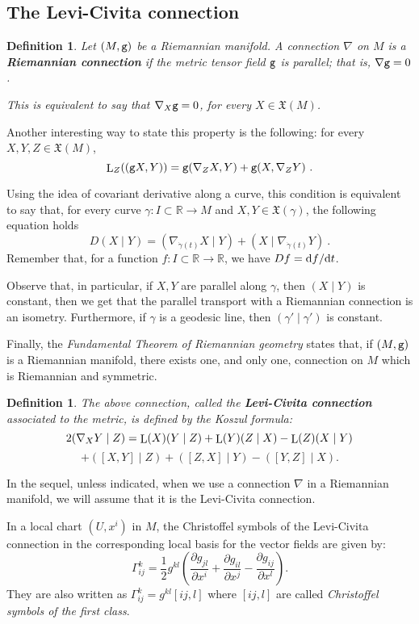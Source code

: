 \documentclass[12pt]{report}
\newtheorem{definition}[teor]{Definition}
\def\vf{\mathfrak X}
\def\d{{\rm d}}
\def\Real{\mathbb{R}}
\def\Lie{\mathop{\rm L}\nolimits}
\begin{document}
\subsection{The Levi-Civita connection}


\begin{definition}
Let $(M,{\tt g})$ be a Riemannian manifold.
A connection $\nabla$ on $M$ is a \textbf{Riemannian connection} 
if the metric tensor field ${\tt g}$ is parallel; that is, $\nabla{\tt g}=0$. 

This is equivalent to say that $\nabla_X{\tt g}=0$, for every $X\in\vf(M)$.
\end{definition}

Another interesting way to state this property is the following:
 for every $X,Y,Z\in\vf(M)$,
$$
\Lie_Z(({\tt g}X,Y))={\tt g}(\nabla_ZX,Y)+{\tt g}(X,\nabla_ZY) \ .
$$  

Using the idea of covariant derivative along a curve,
this condition is equivalent to say that, 
for every curve $\gamma\colon I\subset\Real\to M$ and 
$X,Y\in\vf(\gamma)$,
the following equation holds
  $$
  D(X\mid Y)=(\nabla_{\dot{\gamma}(t)}X\mid Y)+(X\mid\nabla_{\dot\gamma(t)}Y)  \ .
$$
Remember that, for a function $f:I\subset\Real\to\Real$, we have $Df=\d f/\d t$. 

Observe that, in particular, if $X,Y$ are parallel along 
$\gamma$, then $(X\mid Y)$ is constant, 
then we get that the parallel transport with a Riemannian connection is an isometry. 
Furthermore, if $\gamma$ is a geodesic line, then $(\gamma'\mid\gamma')$ is constant.

Finally, the {\sl Fundamental Theorem of Riemannian geometry} states that, 
if $(M,{\tt g})$ is a Riemannian manifold, 
there exists one, and only one, connection on $M$ which is Riemannian and symmetric.

\begin{definition}
The above connection, called the \textbf{Levi-Civita connection}
associated to the metric,  is defined by the {\rm Koszul formula\/}:
$$
2(\nabla_XY\mid Z)=\Lie(X)(Y\mid Z)+\Lie(Y)(Z\mid X)-\Lie(Z)(X\mid Y)
$$
$$
+([X,Y]\mid Z)+([Z,X]\mid Y)-([Y,Z]\mid X).
$$
\end{definition}

In the sequel, unless indicated, when we use a connection $\nabla$ 
in a Riemannian manifold, we will assume that it is the Levi-Civita connection.

In a local chart $(U,x^i)$ in $M$, the Christoffel symbols of the Levi-Civita connection in the corresponding local basis for the vector fields are given by:
$$
\Gamma_{ij}^k=\frac{1}{2}g^{kl}\left(\frac{\partial g_{jl}}{\partial x^i}+\frac{\partial g_{il}}{\partial x^j}-\frac{\partial g_{ij}}{\partial x^l}\right).
$$  
They are also written as $\Gamma_{ij}^k=g^{kl}[ij,l]$ 
where $[ij,l]$ are called {\sl Christoffel symbols of the first class}.
\end{document}
